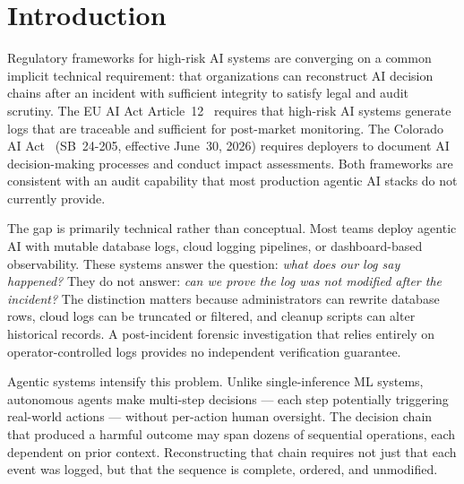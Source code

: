 \documentclass[sigconf,natbib=false]{acmart}
\begin{document}

\maketitle
\fancyhead{}
\fancyhead[LE,RO]{\thepage}
\fancyfoot{}


\section{Introduction}

Regulatory frameworks for high-risk AI systems are converging on a common
implicit technical requirement: that organizations can reconstruct AI
decision chains after an incident with sufficient integrity to satisfy
legal and audit scrutiny. The EU AI Act Article~12~\cite{euaiact} requires
that high-risk AI systems generate logs that are traceable and sufficient
for post-market monitoring. The Colorado AI Act~\cite{coloradoai} (SB~24-205,
effective June~30, 2026) requires deployers to document AI decision-making
processes and conduct impact assessments. Both frameworks are consistent
with an audit capability that most production agentic AI stacks do not
currently provide.

The gap is primarily technical rather than conceptual. Most teams deploy
agentic AI with mutable database logs, cloud logging pipelines, or
dashboard-based observability. These systems answer the question: \textit{what
does our log say happened?} They do not answer: \textit{can we prove the log
was not modified after the incident?} The distinction matters because
administrators can rewrite database rows, cloud logs can be truncated or
filtered, and cleanup scripts can alter historical records. A post-incident
forensic investigation that relies entirely on operator-controlled logs
provides no independent verification guarantee.

Agentic systems intensify this problem. Unlike single-inference ML systems,
autonomous agents make multi-step decisions --- each step potentially
triggering real-world actions --- without per-action human oversight. The
decision chain that produced a harmful outcome may span dozens of sequential
operations, each dependent on prior context. Reconstructing that chain
requires not just that each event was logged, but that the sequence is
complete, ordered, and unmodified.
\end{document}
